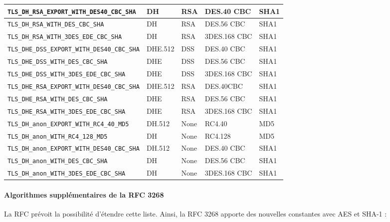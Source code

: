 \documentclass[a4paper,11pt,french]{article}
\begin{document}
\begin{center}
\begin{tabularx}{17cm}{|l|l|l|X|l|}
\hline
\verb+TLS_DH_RSA_EXPORT_WITH_DES40_CBC_SHA+ & DH&RSA&DES.40 CBC&SHA1\\
\hline
\verb+TLS_DH_RSA_WITH_DES_CBC_SHA+ & DH&RSA&DES.56 CBC&SHA1\\
\hline
\verb+TLS_DH_RSA_WITH_3DES_EDE_CBC_SHA+ & DH&RSA&3DES.168 CBC&SHA1\\
\hline
\verb+TLS_DHE_DSS_EXPORT_WITH_DES40_CBC_SHA+ & DHE.512&DSS&DES.40 CBC&SHA1\\
\hline
\verb+TLS_DHE_DSS_WITH_DES_CBC_SHA+ & DHE&DSS&DES.56 CBC&SHA1\\
\hline
\verb+TLS_DHE_DSS_WITH_3DES_EDE_CBC_SHA+ & DHE&DSS&3DES.168 CBC&SHA1\\
\hline
\verb+TLS_DHE_RSA_EXPORT_WITH_DES40_CBC_SHA+ & DHE.512&RSA&DES.40CBC&SHA1\\
\hline
\verb+TLS_DHE_RSA_WITH_DES_CBC_SHA+ & DHE&RSA&DES.56 CBC&SHA1\\
\hline
\verb+TLS_DHE_RSA_WITH_3DES_EDE_CBC_SHA+ & DHE&RSA&3DES.168 CBC&SHA1\\
\hline 
\verb+TLS_DH_anon_EXPORT_WITH_RC4_40_MD5+ & DH.512&None&RC4.40&MD5\\
\hline
\verb+TLS_DH_anon_WITH_RC4_128_MD5+ & DH&None&RC4.128&MD5\\
\hline
\verb+TLS_DH_anon_EXPORT_WITH_DES40_CBC_SHA+ & DH.512&None&DES.40 CBC&SHA1\\
\hline
\verb+TLS_DH_anon_WITH_DES_CBC_SHA+& DH	&None	&DES.56	CBC&SHA1\\
\hline
\verb+TLS_DH_anon_WITH_3DES_EDE_CBC_SHA+ & DH	&None	&3DES.168 CBC&	SHA1\\
\hline
\end{tabularx}
\end{center}


\paragraph{Algorithmes supplémentaires de la RFC 3268}
La RFC prévoit la possibilité d'étendre cette liste. Ainsi, la RFC 3268 apporte des nouvelles constantes avec AES et SHA-1 :
 
\end{document}
